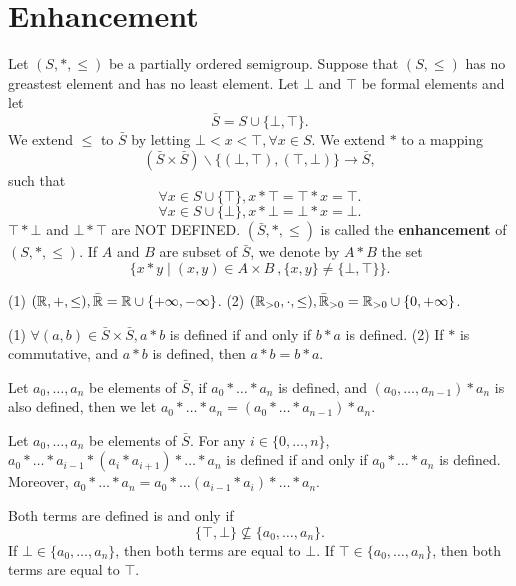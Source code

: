 \section{Enhancement}
\begin{definitionenv}
    Let $(S,*,\le)$ be a partially ordered semigroup. Suppose that $(S,\le )$ has no greastest element and has no least element. Let $\bot$ and $\top$ be formal elements and let 
    $$\bar{S}=S\cup\{\bot,\top\}.$$
    We extend $\le $ to $\bar{S}$ by letting $\bot<x<\top,\forall x\in S$. We extend $*$ to a mapping
    $$\left(\bar{S}\times\bar{S}\right)\backslash \{(\bot,\top),(\top,\bot)\}\longrightarrow \bar{S},$$
    such that 
    $$\forall x\in S\cup\{\top\},x*\top=\top*x=\top.$$
    $$\forall x\in S\cup\{\bot\},x*\bot=\bot*x=\bot.$$
    $\top*\bot$ and $\bot*\top$ are NOT DEFINED. $(\bar{S},*,\le)$ is called the \textbf{enhancement} of $(S,*,\le)$. If $A$ and $B$ are subset of $\bar{S}$, we denote by $A*B$ the set 
    $$\{x*y\mid (x,y)\in A\times B\ ,\{x,y\}\not=\{\bot,\top\}\}.$$
\end{definitionenv}
\begin{exampleenv}
    \quad 
    \newline
    (1) $(\mathbb{R},+,\le ), \bar{\mathbb{R}}=\mathbb{R}\cup\{+\infty,-\infty\}$.
    \newline
    (2) $(\mathbb{R}_{>0},\cdot,\le),\bar{\mathbb{R}}_{>0}=\mathbb{R}_{>0}\cup\{0,+\infty\}$.
\end{exampleenv}
\begin{remark}
    \quad 
    \newline
    (1) $\forall (a,b)\in \bar{S}\times \bar{S}, a*b$ is defined if and only if $b*a$ is defined. 
    \newline
    (2) If $*$ is commutative, and $a*b$ is defined, then $a*b=b*a$.
\end{remark}
\begin{definitionenv}
    Let $a_0,\dots,a_n$ be elements of $\bar{S}$, if $a_0*\dots*a_n$ is defined, and $(a_0,\dots,a_{n-1})*a_n$ is also defined, then we let $a_0*\dots*a_n=\left(a_0*\dots*a_{n-1}\right)*a_n$.
\end{definitionenv}
\begin{propositionenv}
    Let $a_0,\dots,a_n$ be elements of $\bar{S}$. For any $i\in \{0,\dots,n\}$, $a_0*\dots*a_{i-1}*(a_i*a_{i+1})*\dots*a_n$ is defined if and only if $a_0*\dots*a_n$ is defined. Moreover, $a_0*\dots*a_n=a_0*\dots (a_{i-1}*a_i)*\dots*a_n $.
\end{propositionenv}
\begin{proofenv}
    Both terms are defined is and only if 
    $$\{\top,\bot\}\nsubseteq\{a_0,\dots,a_n\}.$$
    If $\bot\in\{a_0,\dots,a_n\}$, then both terms are equal to $\bot$. If $\top\in\{a_0,\dots,a_n\}$, then both terms are equal to $\top$. 
\end{proofenv}
